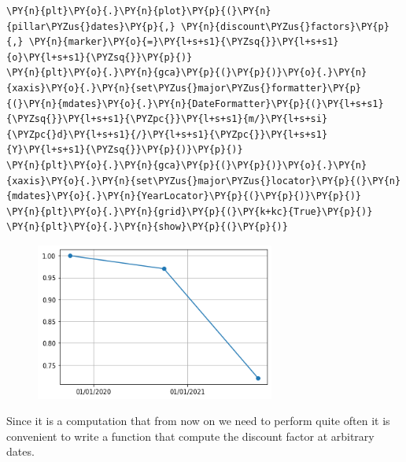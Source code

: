 \begin{tcolorbox}[breakable, size=fbox, boxrule=1pt, pad at break*=1mm,colback=cellbackground, colframe=cellborder]
\begin{Verbatim}[commandchars=\\\{\}]
\PY{n}{plt}\PY{o}{.}\PY{n}{plot}\PY{p}{(}\PY{n}{pillar\PYZus{}dates}\PY{p}{,} \PY{n}{discount\PYZus{}factors}\PY{p}{,} \PY{n}{marker}\PY{o}{=}\PY{l+s+s1}{\PYZsq{}}\PY{l+s+s1}{o}\PY{l+s+s1}{\PYZsq{}}\PY{p}{)}
\PY{n}{plt}\PY{o}{.}\PY{n}{gca}\PY{p}{(}\PY{p}{)}\PY{o}{.}\PY{n}{xaxis}\PY{o}{.}\PY{n}{set\PYZus{}major\PYZus{}formatter}\PY{p}{(}\PY{n}{mdates}\PY{o}{.}\PY{n}{DateFormatter}\PY{p}{(}\PY{l+s+s1}{\PYZsq{}}\PY{l+s+s1}{\PYZpc{}}\PY{l+s+s1}{m/}\PY{l+s+si}{\PYZpc{}d}\PY{l+s+s1}{/}\PY{l+s+s1}{\PYZpc{}}\PY{l+s+s1}{Y}\PY{l+s+s1}{\PYZsq{}}\PY{p}{)}\PY{p}{)}
\PY{n}{plt}\PY{o}{.}\PY{n}{gca}\PY{p}{(}\PY{p}{)}\PY{o}{.}\PY{n}{xaxis}\PY{o}{.}\PY{n}{set\PYZus{}major\PYZus{}locator}\PY{p}{(}\PY{n}{mdates}\PY{o}{.}\PY{n}{YearLocator}\PY{p}{(}\PY{p}{)}\PY{p}{)}
\PY{n}{plt}\PY{o}{.}\PY{n}{grid}\PY{p}{(}\PY{k+kc}{True}\PY{p}{)}
\PY{n}{plt}\PY{o}{.}\PY{n}{show}\PY{p}{(}\PY{p}{)}
\end{Verbatim}
\end{tcolorbox}
\vfill
\begin{figure}[h]
  \centering
  \includegraphics[width=0.7\textwidth]{figures/lecture_3_10_0.png}
\end{figure}
    
Since it is a computation that from now on we need to perform quite often it is convenient to write a function that compute the discount factor at arbitrary dates.

